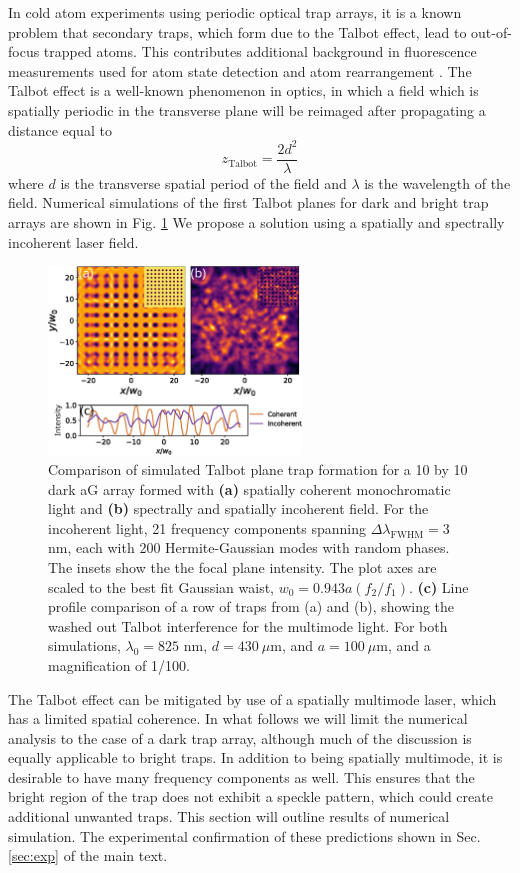 In cold atom experiments using periodic optical trap arrays, it is a known problem that secondary traps, which form due to the Talbot effect, lead to out-of-focus trapped atoms. This contributes additional background in fluorescence measurements used for atom state detection and atom rearrangement \cite{graham2019}. The Talbot effect is a well-known phenomenon in optics, in which a field which is spatially periodic in the transverse plane will be reimaged after propagating a distance equal to 
\begin{equation*}
    z_{\text{Talbot}} = \frac{2d^2}{\lambda}
\end{equation*}
where $d$ is the transverse spatial period of the field and $\lambda$ is the wavelength of the field. Numerical simulations of the first Talbot planes for dark and bright trap arrays are shown in Fig. \ref{fig:talbotcompare} We propose a solution using a spatially and spectrally incoherent laser field. 
\begin{figure}[!th]
    \centering
    \includegraphics[width=0.6\textwidth]{Images/figure7.eps}
    \caption{Comparison of simulated Talbot plane trap formation for a 10 by 10 dark aG array formed with \textbf{(a)} spatially coherent monochromatic light and \textbf{(b)} spectrally and spatially incoherent field. For the incoherent light, 21 frequency components spanning $\Delta \lambda_{\text{FWHM}} = 3$ nm, each with 200 Hermite-Gaussian modes with random phases. The insets show the the focal plane intensity. The plot axes are scaled to the best fit Gaussian waist, $w_0=0.943 a(f_2/f_1)$. \textbf{(c)} Line profile comparison of a row of traps from (a) and (b), showing the washed out Talbot interference for the multimode light. For both simulations, $\lambda_0=825$ nm, $d=430~\mu$m, and $a=100~\mu$m, and a magnification of 1/100.}
    \label{fig:talbotcompare}
\end{figure}

The Talbot effect can be mitigated by use of a spatially multimode laser, which has a limited spatial coherence. In what follows we will limit the numerical analysis to the case of a dark trap array, although much of the discussion is equally applicable to bright traps. In addition to being spatially multimode, it is desirable to have many frequency components as well. This ensures that the bright region of the trap does not exhibit a speckle pattern, which could create additional unwanted traps. This section will outline results of numerical simulation. The experimental confirmation of these predictions shown in Sec. \ref{sec:exp} of the main text. 

